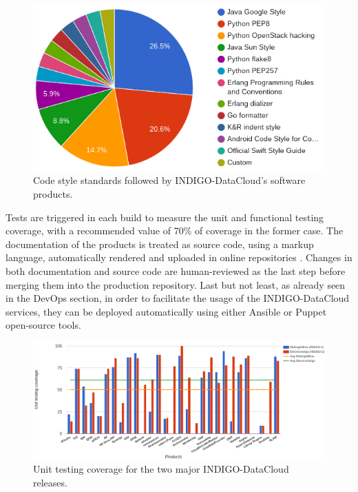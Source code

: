 \documentclass[journal]{IEEEtran}
\begin{document}
\begin{figure}[!t]
\centering
\includegraphics[scale=0.35]{images/codestyle.png}
\caption{Code style standards followed by INDIGO-DataCloud's software products.}
\label{fig:fig_codestyle}
\end{figure}

Tests are triggered in each build to measure the unit and functional testing coverage, with a recommended value of 70\% of coverage in the former case. The documentation of the products is treated as source code, using a markup language, automatically rendered and uploaded in online repositories \cite{indigo-gitbook}. Changes in both documentation and source code are human-reviewed as the last step before merging them into the production repository. Last but not least, as already seen in the DevOps section, in order to facilitate the usage of the INDIGO-DataCloud services, they can be deployed automatically using either Ansible \cite{indigo-ansible} or Puppet \cite{indigo-puppet} open-source tools.

\begin{figure}[!t]
\centering
\includegraphics[scale=0.23]{images/unittest.png}
\caption{Unit testing coverage for the two major INDIGO-DataCloud releases.}
\label{fig:fig_unittest}
\end{figure}
\end{document}
